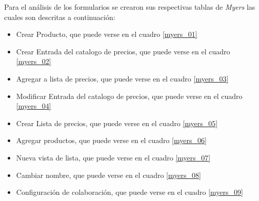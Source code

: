 Para el análisis de los formularios se crearon sus respectivas tablas de
\emph{Myers} las cuales son descritas a continuación:

\begin{itemize}
\item Crear Producto, que puede verse en el cuadro \ref{myers_01}
\item Crear Entrada del catalogo de precios, que puede verse en el cuadro \ref{myers_02}
\item Agregar a lista de precios, que puede verse en el cuadro \ref{myers_03}
\item Modificar Entrada del catalogo de precios, que puede verse en el cuadro \ref{myers_04}
\item Crear Lista de precios, que puede verse en el cuadro \ref{myers_05}
\item Agregar productos, que puede verse en el cuadro \ref{myers_06}
\item Nueva vista de lista, que puede verse en el cuadro \ref{myers_07}
\item Cambiar nombre, que puede verse en el cuadro \ref{myers_08}
\item Configuración de colaboración, que puede verse en el cuadro \ref{myers_09}
\end{itemize}

